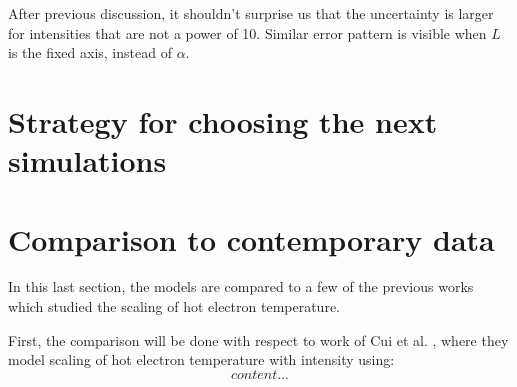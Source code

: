 After previous discussion, it shouldn't surprise us that the uncertainty is larger for intensities that are not a power of 10. Similar error pattern is visible when $L$ is the fixed axis, instead of $\alpha$.

\section{Strategy for choosing the next simulations}


\section{Comparison to contemporary data}
\label{ch:comparison}
In this last section, the models are compared to a few of the previous works which studied the scaling of hot electron temperature.

First, the comparison will be done with respect to work of Cui et al. \cite{cui2013}, where they model scaling of hot electron temperature with intensity using:
\begin{equation}
	content...
\end{equation}


